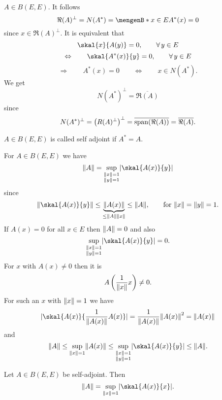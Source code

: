 \begin{beispiel}
	$A \in B(E,E)$. It follows
	\[
		\Re(A)^{\perp} = N(A^*) = \set[x \in E]{A^*(x) = 0}
	\]
	since $x \in \Re(A)^{\perp}$. It is equivalent that
	\[
		\skal{x}{A(y)} = 0, \qquad \forall\, y \in E
	\] 
	\[
		\Leftrightarrow \qquad \skal{A^*(x)}{y} = 0, \qquad \forall\, y \in E
	\]
	\[
		\Rightarrow \qquad A^*(x) = 0 \qquad \Leftrightarrow \qquad x \in N(A^*).
	\]
	We get
	\[
		N(A^*)^{\perp} = \overline{\Re(A)}
	\]
	since
	\[
		N(A^*)^{\perp} = \left( R(A)^{\perp} \right)^{\perp} = \overline{\operatorname{span}(\Re(A))} = \overline{\Re(A)}.
	\]
\end{beispiel}
\begin{bemerkung}
	$A \in B(E,E)$ is called self adjoint if $A^* = A$.
\end{bemerkung}
For $A \in B(E,E)$ we have
\[
	\norm{A} =\sup\limits_{\substack{\norm{x} = 1  \\ \norm{y}=1}} \abs{\skal{A(x)}{y}}
\]
since
\[
	\norm{\skal{A(x)}{y}} \leq \underset{\leq \norm{A}\norm{x}}{\underbrace{\norm{A(x)}}} \leq \norm{A}, \qquad \text{for }\norm{x}=\norm{y}=1.
\]
If $A(x) = 0$ for all $x \in E$ then $\norm{A}=0$ and also
\[
	\sup\limits_{\substack{\norm{x} = 1  \\ \norm{y}=1}} \abs{\skal{A(x)}{y}} = 0.
\]
For $x$ with $A(x) \neq 0$ then it is
\[
	A \left( \frac{1}{\norm{x}}x \right) \neq 0.
\]
For such an $x$ with $\norm{x}=1$ we have
\[
	\abs{\skal{A(x)}{\frac{1}{\norm{A(x)}}A(x)}} = \frac{1}{\norm{A(x)}} \norm{A(x)}^2 = \norm{A(x)}
\]
and
\[
	\norm{A} \leq \sup_{\norm{x}=1} \norm{A(x)} \leq \sup\limits_{\substack{\norm{x} = 1  \\ \norm{y}=1}} \abs{\skal{A(x)}{y}} \leq \norm{A}.
\]
\begin{proposition}
	Let $A \in B(E,E)$ be self-adjoint. Then
	\[
		\norm{A} = \sup_{\norm{x}=1} \abs{\skal{A(x)}{x}}.
	\]
\end{proposition}
